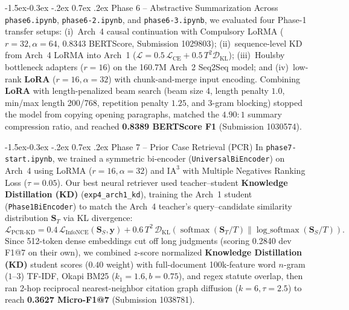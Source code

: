 \documentclass[11pt, oneside]{article}
\makeatletter
\renewcommand\subsection{\@startsection{subsection}{2}{\z@}%
  {-1.5ex\@plus -0.3ex \@minus -.2ex}%
  {0.7ex \@plus .2ex}%
  {\normalfont\large\bfseries}}
\makeatother
\begin{document}
\subsection{Phase 6 -- Abstractive Summarization}
Across \texttt{phase6.ipynb}, \texttt{phase6-2.ipynb}, and \texttt{phase6-3.ipynb}, we evaluated four Phase-1 transfer setups: (i)~Arch~4 causal continuation with Compulsory LoRMA ($r=32, \alpha=64$, 0.8343 BERTScore, Submission 1029803); (ii)~sequence-level KD from Arch~4 LoRMA into Arch~1 ($\mathcal{L} = 0.5\,\mathcal{L}_{\mathrm{CE}} + 0.5\,T^2\mathcal{D}_{\mathrm{KL}}$); (iii)~Houlsby bottleneck adapters ($r=16$) on the 160.7M Arch~2 Seq2Seq model; and (iv)~low-rank \textbf{LoRA} ($r=16, \alpha=32$) with chunk-and-merge input encoding. Combining \textbf{LoRA} with length-penalized beam search (beam size 4, length penalty $1.0$, min/max length 200/768, repetition penalty $1.25$, and 3-gram blocking) stopped the model from copying opening paragraphs, matched the $4.90:1$ summary compression ratio, and reached \textbf{0.8389 BERTScore F1} (Submission 1030574).

\subsection{Phase 7 -- Prior Case Retrieval (PCR)}
In \texttt{phase7-start.ipynb}, we trained a symmetric bi-encoder (\texttt{UniversalBiEncoder}) on Arch~4 using LoRMA ($r=16, \alpha=32$) and $\text{IA}^3$ with Multiple Negatives Ranking Loss ($\tau=0.05$). Our best neural retriever used teacher--student \textbf{Knowledge Distillation (KD)} (\texttt{exp4\_arch1\_kd}), training the Arch~1 student (\texttt{Phase1BiEncoder}) to match the Arch~4 teacher's query--candidate similarity distribution $\mathbf{S}_T$ via KL divergence:
\begin{equation}
\mathcal{L}_{\mathrm{PCR\text{-}KD}} = 0.4\,\mathcal{L}_{\mathrm{InfoNCE}}(\mathbf{S}_S, \mathbf{y}) + 0.6\,T^2\,\mathcal{D}_{\mathrm{KL}}\!\left(\operatorname{softmax}(\mathbf{S}_T/T) \parallel \operatorname{log\_softmax}(\mathbf{S}_S/T)\right).
\end{equation}
Since 512-token dense embeddings cut off long judgments (scoring 0.2840 dev F1@7 on their own), we combined $z$-score normalized \textbf{Knowledge Distillation (KD)} student scores ($0.40$ weight) with full-document 100k-feature word $n$-gram ($1\text{--}3$) TF-IDF, Okapi BM25 ($k_1=1.6, b=0.75$), and regex statute overlap, then ran 2-hop reciprocal nearest-neighbor citation graph diffusion ($k=6, \tau=2.5$) to reach \textbf{0.3627 Micro-F1@7} (Submission 1038781).
\end{document}
